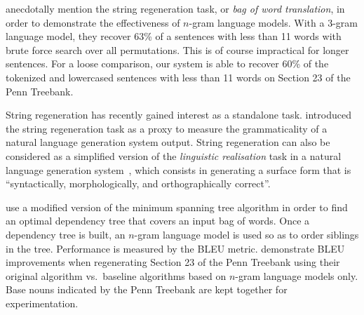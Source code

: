 
\citet{brown-cocke-dellapietra-dellapietra-jelinek-lafferty-mercer-roossin:1990:CL}
anecdotally mention the string regeneration task, or \emph{bag of word translation},
in order to demonstrate the effectiveness
of $n$-gram language models. With a 3-gram language model, they recover
63\% of a sentences with less than 11 words with brute force search
over all permutations. This is of course impractical for longer
sentences. For a loose comparison, our system is able to recover
60\% of the tokenized and lowercased sentences with less than 11 words
on Section 23 of the Penn Treebank.

String regeneration has recently gained interest as
a standalone
task.%
%
%
%
\citet{wan-dras-dale-paris:2009:EACL} introduced the string regeneration
task as a proxy to measure the grammaticality of a
natural language generation system output.
String regeneration can also be considered as a simplified version
of the \emph{linguistic realisation} task in a natural language
generation system~\citep{reiter-dale:1997:JNLE}, which consists in
generating a surface form that is ``syntactically, morphologically,
and orthographically correct''.

\citet{wan-dras-dale-paris:2009:EACL} use a
modified version of the minimum spanning tree algorithm
in order to find an optimal dependency tree that covers an input bag of words.
Once a dependency tree is built, an $n$-gram language model is used
so as to order siblings in the tree.
Performance is measured by the BLEU metric.
\citet{wan-dras-dale-paris:2009:EACL} demonstrate BLEU
improvements when regenerating Section 23 of the
Penn Treebank using their original algorithm vs.\ baseline
algorithms based on $n$-gram language models only. Base nouns
indicated by the Penn Treebank are kept together for experimentation.


